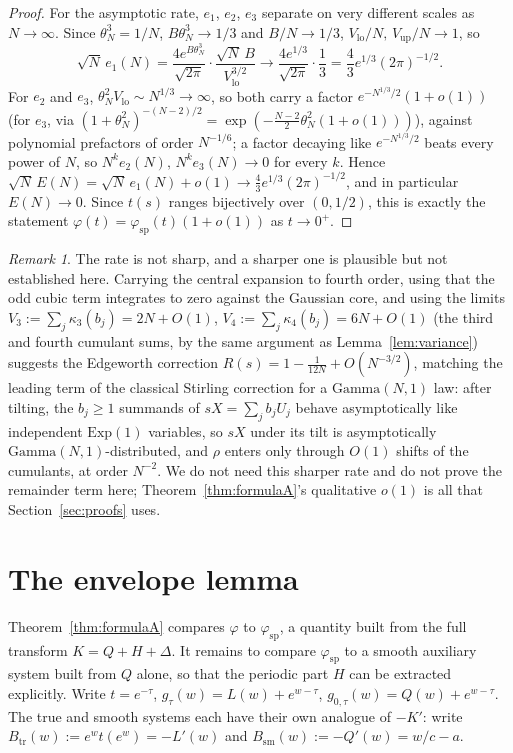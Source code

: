 \documentclass[11pt]{amsart}
\theoremstyle{plain}
\theoremstyle{definition}
\theoremstyle{remark}
\newtheorem{remark}[theorem]{Remark}
\begin{document}
\begin{proof}
For the asymptotic rate, $e_1$, $e_2$, $e_3$ separate on very different scales as $N\to\infty$.
Since $\theta_N^3=1/N$, $B\theta_N^3\to1/3$ and $B/N\to1/3$, $V_{\mathrm{lo}}/N,\,V_{\mathrm{up}}/N
\to1$, so
\[
\sqrt N\,e_1(N) = \frac{4e^{B\theta_N^3}}{\sqrt{2\pi}}\cdot\frac{\sqrt N\,B}{V_{\mathrm{lo}}^{3/2}}
\longrightarrow \frac{4e^{1/3}}{\sqrt{2\pi}}\cdot\frac13 = \frac43e^{1/3}(2\pi)^{-1/2}.
\]
For $e_2$ and $e_3$, $\theta_N^2V_{\mathrm{lo}} \sim N^{1/3}\to\infty$, so both carry a factor
$e^{-N^{1/3}/2}(1+o(1))$ (for $e_3$, via $(1+\theta_N^2)^{-(N-2)/2} =
\exp(-\tfrac{N-2}2\theta_N^2(1+o(1)))$), against polynomial prefactors of order $N^{-1/6}$; a
factor decaying like $e^{-N^{1/3}/2}$ beats every power of $N$, so $N^k e_2(N),\,N^k e_3(N)\to0$
for every $k$. Hence $\sqrt N\,E(N) = \sqrt N\,e_1(N) + o(1) \to \tfrac43e^{1/3}(2\pi)^{-1/2}$, and
in particular $E(N)\to0$. Since $t(s)$ ranges bijectively over $(0,1/2)$, this is exactly the
statement $\varphi(t)=\varphi_{\mathrm{sp}}(t)(1+o(1))$ as $t\to0^+$.
\end{proof}

\begin{remark}
\label{rem:edgeworth}
The rate is not sharp, and a sharper one is plausible but not established here. Carrying the
central expansion to fourth order, using that the odd cubic term integrates to zero against the
Gaussian core, and using the limits $V_3 := \sum_j\kappa_3(b_j) = 2N+O(1)$, $V_4 :=
\sum_j\kappa_4(b_j) = 6N+O(1)$ (the third and fourth cumulant sums, by the same argument as
Lemma~\ref{lem:variance}) suggests the Edgeworth correction $R(s) = 1 - \tfrac1{12N} +
O(N^{-3/2})$, matching the leading term of the classical Stirling correction for a
$\mathrm{Gamma}(N,1)$ law: after tilting, the $b_j\ge1$ summands of $sX=\sum_jb_jU_j$ behave
asymptotically like independent $\mathrm{Exp}(1)$ variables, so $sX$ under its tilt is asymptotically
$\mathrm{Gamma}(N,1)$-distributed, and $\rho$ enters only through $O(1)$ shifts of the cumulants,
at order $N^{-2}$. We do not need this sharper rate and do not prove the remainder term here;
Theorem~\ref{thm:formulaA}'s qualitative $o(1)$ is all that Section~\ref{sec:proofs} uses.
\end{remark}

\section{The envelope lemma}
\label{sec:envelope}

Theorem~\ref{thm:formulaA} compares $\varphi$ to $\varphi_{\mathrm{sp}}$, a quantity built from the
full transform $K=Q+H+\Delta$. It remains to compare $\varphi_{\mathrm{sp}}$ to a smooth auxiliary
system built from $Q$ alone, so that the periodic part $H$ can be extracted explicitly. Write
$t=e^{-\tau}$, $g_\tau(w) = L(w)+e^{w-\tau}$, $g_{0,\tau}(w) = Q(w)+e^{w-\tau}$. The true and smooth
systems each have their own analogue of $-K'$: write $B_{\mathrm{tr}}(w) := e^wt(e^w) = -L'(w)$ and
$B_{\mathrm{sm}}(w) := -Q'(w) = w/c-a$.
\end{document}
